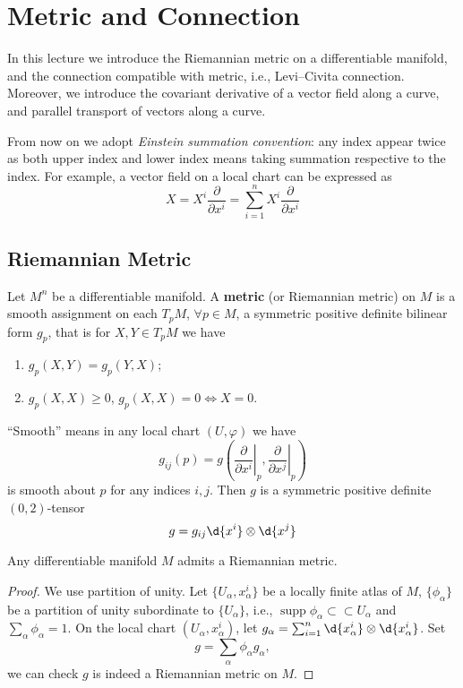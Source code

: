 \chapter{Metric and Connection}

In this lecture we introduce the Riemannian metric on a differentiable manifold, and the connection compatible with metric, i.e., Levi--Civita connection.
Moreover, we introduce the covariant derivative of a vector field along a curve, and parallel transport of vectors along a curve.

\begin{symb}
    From now on we adopt \emph{Einstein summation convention}:
    any index appear twice as both upper index and lower index means taking summation respective to the index.
    For example, a vector field on a local chart can be expressed as
    \[X=X^i\frac{\partial{}}{\partial{x^i}}=\sum_{i=1}^nX^i\frac{\partial{}}{\partial{x^i}}\]
\end{symb}

\section{Riemannian Metric}

\begin{defn}
    Let $M^n$ be a differentiable manifold.
    A \textbf{metric} (or Riemannian metric) on $M$ is a smooth assignment on each $T_pM$, $\forall p\in M$, a symmetric positive definite bilinear form $g_p$, that is for $X,Y\in T_pM$ we have
    \begin{enumerate}
        \item $g_p(X,Y)=g_p(Y,X)$;
        \item $g_p(X,X)\geq 0$, $g_p(X,X)=0\iff X=0$.
    \end{enumerate}
    ``Smooth'' means in any local chart $(U,\varphi)$ we have
    \[g_{ij}(p)=g\left(\left.\frac{\partial{}}{\partial{x^i}}\right|_p,\left.\frac{\partial{}}{\partial{x^j}}\right|_p\right)\]
    is smooth about $p$ for any indices $i,j$.
    Then $g$ is a symmetric positive definite $(0,2)$-tensor
    \[g=g_{ij}\d{x^i}\otimes\d{x^j}\]
\end{defn}

\begin{prop}
    Any differentiable manifold $M$ admits a Riemannian metric.
\end{prop}
\begin{proof}
    We use partition of unity.
    Let $\{U_\alpha,x_\alpha^i\}$ be a locally finite atlas of $M$, $\{\phi_\alpha\}$ be a partition of unity subordinate to $\{U_\alpha\}$, i.e., $\operatorname{supp}\phi_\alpha\subset\subset U_\alpha$ and $\sum_\alpha\phi_\alpha=1$.
    On the local chart $(U_\alpha,x_\alpha^i)$, let $g_\alpha=\sum_{i=1}^n\d{x_\alpha^i}\otimes\d{x_\alpha^i}$.
    Set
    \[g=\sum_{\alpha}\phi_\alpha g_\alpha,\]
    we can check $g$ is indeed a Riemannian metric on $M$.
\end{proof}

